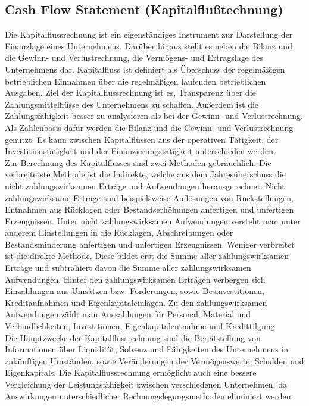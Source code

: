 \subsection{Cash Flow Statement (Kapitalflußtechnung)}
Die Kapitalflussrechnung ist ein eigenständiges Instrument zur Darstellung der Finanzlage eines Unternehmens. Darüber hinaus stellt es neben die Bilanz und die Gewinn- und Verlustrechnung, die Vermögens- und Ertragslage des Unternehmens dar. \cite{coenenberg2001kapitalflussrechnung} Kapitalfluss ist definiert als Überschuss der regelmäßigen betrieblichen Einnahmen über die regelmäßigen laufenden betrieblichen Ausgaben. Ziel der Kapitalflussrechnung ist es, Transparenz über die Zahlungsmittelflüsse des Unternehmens zu schaffen. Außerdem ist die Zahlungsfähigkeit besser zu analysieren als bei der Gewinn- und Verlustrechnung. Als Zahlenbasis dafür werden die Bilanz und die Gewinn- und Verlustrechnung genutzt. Es kann zwischen Kapitalflüssen aus der operativen Tätigkeit, der Investitionstätigkeit und der Finanzierungstätigkeit unterschieden werden. \cite{kapitalfluss}
\\ Zur Berechnung des Kapitalflusses sind zwei Methoden gebräuchlich. Die verbreitetste Methode ist die Indirekte, welche aus dem Jahresüberschuss die nicht zahlungswirksamen Erträge und Aufwendungen herausgerechnet. Nicht zahlungswirksame Erträge sind beispielsweise Auflösungen von Rückstellungen, Entnahmen aus Rücklagen oder Bestandserhöhungen anfertigen und unfertigen Erzeugnissen. Unter nicht zahlungswirksamen Aufwendungen versteht man unter anderem Einstellungen in die Rücklagen, Abschreibungen oder Bestandsminderung anfertigen und unfertigen Erzeugnissen. Weniger verbreitet ist die direkte Methode. Diese bildet erst die Summe aller zahlungswirksamen Erträge und subtrahiert davon die Summe aller zahlungswirksamen Aufwendungen. Hinter den zahlungswirksamen Erträgen verbergen sich Einzahlungen aus Umsätzen bzw. Forderungen, sowie Desinvestitionen, Kreditaufnahmen und Eigenkapitaleinlagen. Zu den zahlungswirksamen Aufwendungen zählt man Auszahlungen für Personal, Material und Verbindlichkeiten, Investitionen, Eigenkapitalentnahme und Kredittilgung.\cite{cashflow}
\\
Die Hauptzwecke der Kapitalflussrechnung sind die Bereitstellung von Informationen über Liquidität, Solvenz und Fähigkeiten des Unternehmens in zukünftigen Umständen, sowie Veränderungen der Vermögenswerte, Schulden und Eigenkapitals. Die Kapitalflussrechnung ermöglicht auch eine bessere Vergleichung der Leistungsfähigkeit zwischen verschiedenen Unternehmen, da Auswirkungen unterschiedlicher Rechnungslegungsmethoden eliminiert werden. \cite{coenenberg2001kapitalflussrechnung}

